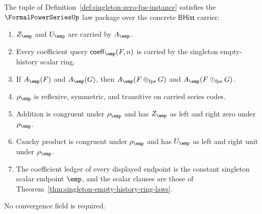 \begin{theorem}
\label{thm:singleton-zero-fps-laws}
\label{thm:singleton-empty-history-fps-laws}
The tuple of Definition~\ref{def:singleton-zero-fps-instance} satisfies the
$\FormalPowerSeriesUp$ law package over the concrete $\mathsf{BHist}$ carrier:
\begin{enumerate}
  \item $Z_{\emp}$ and $U_{\emp}$ are carried by $A_{\emp}$.
  \item Every coefficient query $\mathsf{coeff}_{\emp}(F,n)$ is carried by the
  singleton empty-history scalar ring.
  \item If $A_{\emp}(F)$ and $A_{\emp}(G)$, then
  $A_{\emp}(F\oplus_{\mathrm{fps}}G)$ and
  $A_{\emp}(F\odot_{\mathrm{fps}}G)$.
  \item $\rho_{\emp}$ is reflexive, symmetric, and transitive on carried series
  codes.
  \item Addition is congruent under $\rho_{\emp}$ and has $Z_{\emp}$ as left
  and right zero under $\rho_{\emp}$.
  \item Cauchy product is congruent under $\rho_{\emp}$ and has $U_{\emp}$ as
  left and right unit under $\rho_{\emp}$.
  \item The coefficient ledger of every displayed endpoint is the constant
  singleton scalar endpoint $\emp$, and the scalar clauses are those of
  Theorem~\ref{thm:singleton-empty-history-ring-laws}.
\end{enumerate}
No convergence field is required.
\end{theorem}
